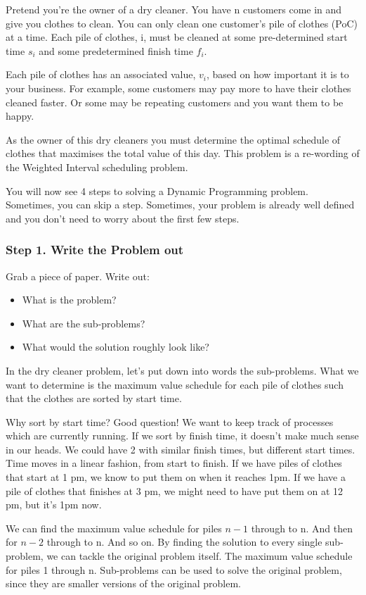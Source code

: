 \documentclass{article}
\begin{document}
Pretend you're the owner of a dry cleaner. You have n customers come in and give you clothes to clean. You can only clean one customer's pile of clothes (PoC) at a time. Each pile of clothes, i, must be cleaned at some pre-determined start time $s_i$ and some predetermined finish time $f_i$.

Each pile of clothes has an associated value, $v_i$, based on how important it is to your business. For example, some customers may pay more to have their clothes cleaned faster. Or some may be repeating customers and you want them to be happy.

As the owner of this dry cleaners you must determine the optimal schedule of clothes that maximises the total value of this day. This problem is a re-wording of the Weighted Interval scheduling problem. 

You will now see 4 steps to solving a Dynamic Programming problem. Sometimes, you can skip a step. Sometimes, your problem is already well defined and you don't need to worry about the first few steps.

\subsubsection{Step 1. Write the Problem out}
Grab a piece of paper. Write out:
\begin{itemize}
    \item What is the problem?
    \item What are the sub-problems?
    \item What would the solution roughly look like?
\end{itemize}

In the dry cleaner problem, let's put down into words the sub-problems. What we want to determine is the maximum value schedule for each pile of clothes such that the clothes are sorted by start time.

Why sort by start time? Good question! We want to keep track of processes which are currently running. If we sort by finish time, it doesn't make much sense in our heads. We could have 2 with similar finish times, but different start times. Time moves in a linear fashion, from start to finish. If we have piles of clothes that start at 1 pm, we know to put them on when it reaches 1pm. If we have a pile of clothes that finishes at 3 pm, we might need to have put them on at 12 pm, but it's  1pm now. 

We can find the maximum value schedule for piles $n - 1$ through to n. And then for $n - 2$ through to n. And so on. By finding the solution to every single sub-problem, we can tackle the original problem itself. The maximum value schedule for piles 1 through n. Sub-problems can be used to solve the original problem, since they are smaller versions of the original problem.
\end{document}
